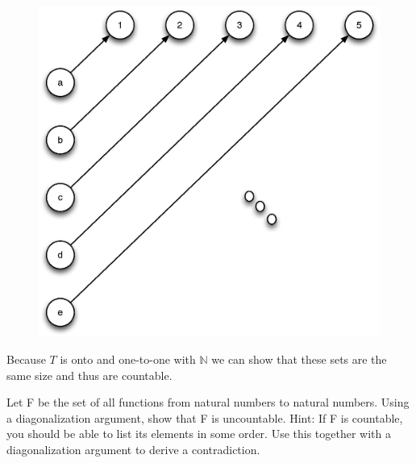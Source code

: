\begin{problem}{1}
\begin{solution}
\begin{figure}[H]
      \includegraphics[scale=.5]{problem_1_b.eps}
      \label{fig:problem_1_b}
    \end{figure}
    Because $T$ is onto and one-to-one with $\mathbb{N}$ we can show that these sets are the same size and thus are
    countable.
  \end{solution}
\end{problem}

\begin{problem}{2}
  Let F be the set of all functions from natural numbers to natural numbers. Using a diagonalization argument, show that
  F is uncountable. Hint: If F is countable, you should be able to list its elements in some order. Use this together
  with a diagonalization argument to derive a contradiction.
\end{problem}

